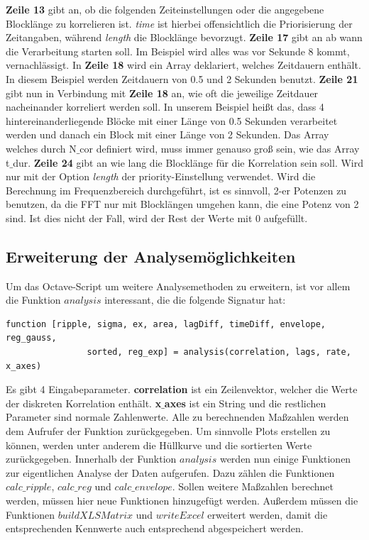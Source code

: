 \textbf{Zeile 13} gibt an, ob die folgenden Zeiteinstellungen oder die angegebene Blocklänge zu korrelieren ist. \textit{time} ist hierbei offensichtlich die Priorisierung der Zeitangaben, während \textit{length} die Blocklänge bevorzugt.\newline
\textbf{Zeile 17} gibt an ab wann die Verarbeitung starten soll. Im Beispiel wird alles was vor Sekunde 8 kommt, vernachlässigt. \newline
In \textbf{Zeile 18} wird ein Array deklariert, welches Zeitdauern enthält. In diesem Beispiel werden Zeitdauern von 0.5 und 2 Sekunden benutzt. \newline
\textbf{Zeile 21} gibt nun in Verbindung mit \textbf{Zeile 18} an, wie oft die jeweilige Zeitdauer nacheinander korreliert werden soll. In unserem Beispiel heißt das, dass 4 hintereinanderliegende Blöcke mit einer Länge von 0.5 Sekunden verarbeitet werden und danach ein Block mit einer Länge von 2 Sekunden. Das Array welches durch N$\_$cor definiert wird, muss immer genauso groß sein, wie das Array t$\_$dur.\newline
\textbf{Zeile 24} gibt an wie lang die Blocklänge für die Korrelation sein soll. Wird nur mit der Option \textit{length} der priority-Einstellung verwendet. Wird die Berechnung im Frequenzbereich durchgeführt, ist es sinnvoll, 2-er Potenzen zu benutzen, da die FFT nur mit Blocklängen umgehen kann, die eine Potenz von 2 sind. Ist dies nicht der Fall, wird der Rest der Werte mit 0 aufgefüllt.\newline

\subsection{Erweiterung der Analysemöglichkeiten}
Um das Octave-Script um weitere Analysemethoden zu erweitern, ist vor allem die Funktion $analysis$ interessant, die die folgende Signatur hat:
\begin{lstlisting}
function [ripple, sigma, ex, area, lagDiff, timeDiff, envelope, reg_gauss, 
                sorted, reg_exp] = analysis(correlation, lags, rate, x_axes)
\end{lstlisting}
Es gibt 4 Eingabeparameter. \textbf{correlation} ist ein Zeilenvektor, welcher die Werte der diskreten Korrelation enthält. \textbf{x$\_$axes} ist ein String und die restlichen Parameter sind normale Zahlenwerte. Alle zu berechnenden Maßzahlen werden dem Aufrufer der Funktion zurückgegeben. Um sinnvolle Plots erstellen zu können, werden unter anderem die Hüllkurve und die sortierten Werte zurückgegeben.  
Innerhalb der Funktion $analysis$ werden nun einige Funktionen zur eigentlichen Analyse der Daten aufgerufen. Dazu zählen die Funktionen $calc\_ripple$, $calc\_reg$ und $calc\_envelope$. Sollen weitere Maßzahlen berechnet werden, müssen hier neue Funktionen hinzugefügt werden. Außerdem müssen die Funktionen $buildXLSMatrix$ und $writeExcel$ erweitert werden, damit die entsprechenden Kennwerte auch entsprechend abgespeichert werden.
